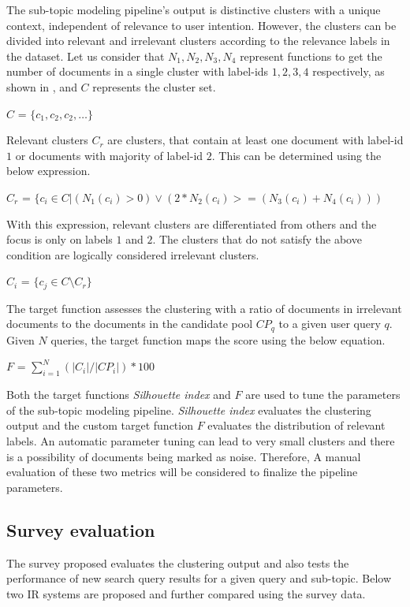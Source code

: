 \documentclass[master,proposal,extern,palatino]{rgseThesis}
\begin{document}
	The sub-topic modeling pipeline's output is distinctive clusters with a unique context, 
	independent of relevance to user intention. However, the clusters can be divided into relevant and irrelevant clusters according to the relevance labels in the dataset.
	Let us consider that $N_1, N_2, N_3, N_4$ represent functions to get the number of documents in a single cluster with label-ids $1, 2, 3, 4$ respectively, as shown in ,  and $C$ represents the cluster set. 
	
	\centerline{$C$ = $\{c_1, c_2, c_2,\dots\}$}
	
	Relevant clusters $C_r$ are clusters, that contain at least one document with label-id $1$ or documents with majority of label-id $2$. This can be determined using the below expression.
	
	\centerline{$C_r$ = $\{c_i \in C | (N_1(c_i) > 0) \lor (2 * N_2(c_i) >= (N_3(c_i) + N_4(c_i))) $}
	
	With this expression, relevant clusters are differentiated from others and the focus is only on labels $1$ and $2$. The clusters that do not satisfy the above condition are logically considered irrelevant clusters. 
	
	\centerline{$C_i$ = $\{c_j \in C \setminus C_r\} $}
	
	The target function assesses the clustering with a ratio of documents in irrelevant documents to the documents in the candidate pool $CP_q$ to a given user query $q$. Given $N$ queries, the target function maps the score using the below equation. 
	
	\centerline{$F$ = $\sum\limits_{i=1}^N (|C_i|/|CP_i|) * 100 $}
	
	Both the target functions \textit{Silhouette index} and $F$ are used to tune the parameters of the sub-topic modeling pipeline. \textit{Silhouette index} evaluates the clustering output and the custom target function $F$ evaluates the distribution of relevant labels. An automatic parameter tuning can lead to very small clusters and there is a possibility of documents being marked as noise. Therefore,  A manual evaluation of these two metrics will be considered to finalize the pipeline parameters. 
	
	\subsection{Survey evaluation}
	
	The survey proposed evaluates the clustering output and also tests the
	performance of new search query results for a given query and sub-topic. Below two IR systems are proposed and further compared using the survey data.
	
\end{document}
